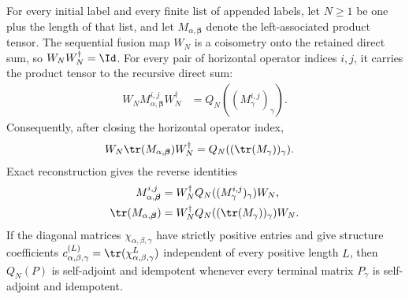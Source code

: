\begin{lemma}%
    \label{thm:mpdo_topological_projector_recursion}
    \leanok
    For every initial label and every finite list of appended labels, let
    $N\geq1$ be one plus the length of that list, and let
    $M_{\alpha,\boldsymbol\beta}$ denote the left-associated product tensor.
    The sequential fusion map $W_N$ is a coisometry onto the retained direct
    sum, so $W_NW_N^\dagger=\Id$. For every pair of horizontal operator
    indices $i,j$, it carries the product tensor to the recursive direct sum:
    \begin{align}
        W_N M_{\alpha,\boldsymbol\beta}^{i,j}W_N^\dagger
         & =Q_N((M_\gamma^{i,j})_\gamma).
        \label{eq:rfp_recursive_fusion}
    \end{align}
    Consequently, after closing the horizontal operator index,
    \begin{align}
        W_N\tr(M_{\alpha,\boldsymbol\beta})W_N^\dagger
         & =Q_N((\tr(M_\gamma))_\gamma).
        \label{eq:rfp_recursive_trace}
    \end{align}
    Exact reconstruction gives the reverse identities
    \begin{align}
        M_{\alpha,\boldsymbol\beta}^{i,j}
         & =W_N^\dagger
        Q_N((M_\gamma^{i,j})_\gamma)
        W_N,
        \label{eq:rfp_reverse_fusion} \\
        \tr(M_{\alpha,\boldsymbol\beta})
         & =W_N^\dagger
        Q_N((\tr(M_\gamma))_\gamma)
        W_N.
        \label{eq:rfp_reverse_trace}
    \end{align}
    If the diagonal matrices $\chi_{\alpha,\beta,\gamma}$ have strictly
    positive entries and give structure coefficients
    $c_{\alpha,\beta,\gamma}^{(L)}
        =\tr(\chi_{\alpha,\beta,\gamma}^{L})$ independent of every positive
    length $L$, then $Q_N(P)$ is self-adjoint and idempotent whenever
    every terminal matrix $P_\gamma$ is self-adjoint and idempotent.


\end{lemma}
